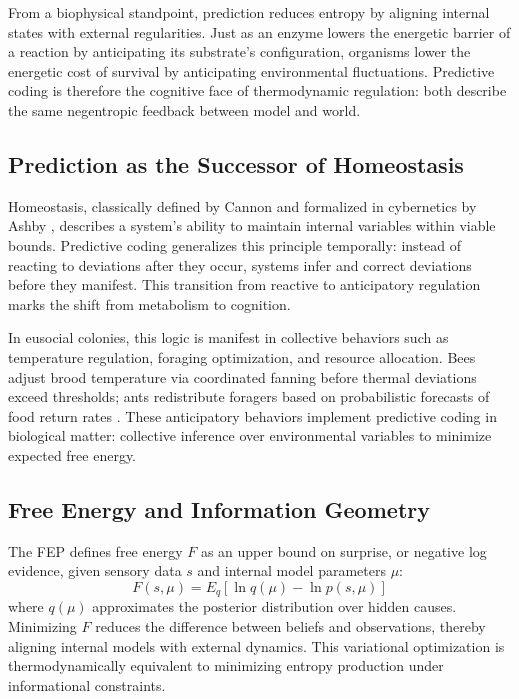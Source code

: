 \documentclass[11pt,a4paper]{article}
\begin{document}
From a biophysical standpoint, prediction reduces entropy by aligning internal states with external regularities.  Just as an enzyme lowers the energetic barrier of a reaction by anticipating its substrate’s configuration, organisms lower the energetic cost of survival by anticipating environmental fluctuations.  Predictive coding is therefore the cognitive face of thermodynamic regulation: both describe the same negentropic feedback between model and world.

\subsection{Prediction as the Successor of Homeostasis}

Homeostasis, classically defined by Cannon and formalized in cybernetics by Ashby \citep{Ashby1956DesignBrain}, describes a system’s ability to maintain internal variables within viable bounds.  Predictive coding generalizes this principle temporally: instead of reacting to deviations after they occur, systems infer and correct deviations before they manifest.  This transition from reactive to anticipatory regulation marks the shift from metabolism to cognition.

In eusocial colonies, this logic is manifest in collective behaviors such as temperature regulation, foraging optimization, and resource allocation.  Bees adjust brood temperature via coordinated fanning before thermal deviations exceed thresholds; ants redistribute foragers based on probabilistic forecasts of food return rates \citep{Seeley2010HoneybeeDemocracy, Gordon2010AntEncounters}.  These anticipatory behaviors implement predictive coding in biological matter: collective inference over environmental variables to minimize expected free energy.

\subsection{Free Energy and Information Geometry}

The FEP defines free energy \( F \) as an upper bound on surprise, or negative log evidence, given sensory data \( s \) and internal model parameters \( \mu \):
\[
F(s, \mu) = E_q[\ln q(\mu) - \ln p(s, \mu)]
\]
where \( q(\mu) \) approximates the posterior distribution over hidden causes.  Minimizing \( F \) reduces the difference between beliefs and observations, thereby aligning internal models with external dynamics.  This variational optimization is thermodynamically equivalent to minimizing entropy production under informational constraints.
\end{document}
